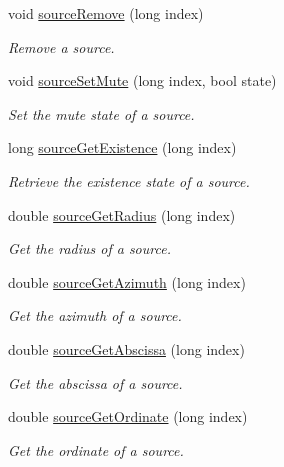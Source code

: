 \begin{DoxyCompactItemize}
void \hyperlink{class_hoa2_d_1_1_sources_manager_ac3af058afdb4367a2c62a89cf9e77c52}{source\-Remove} (long index)
\begin{DoxyCompactList}\small\item\em Remove a source. \end{DoxyCompactList}\item 
void \hyperlink{class_hoa2_d_1_1_sources_manager_ad278d345eded951493e85c9554b61911}{source\-Set\-Mute} (long index, bool state)
\begin{DoxyCompactList}\small\item\em Set the mute state of a source. \end{DoxyCompactList}\item 
long \hyperlink{class_hoa2_d_1_1_sources_manager_a9d183dbdf4f1c3a4d82b6967b12100a8}{source\-Get\-Existence} (long index)
\begin{DoxyCompactList}\small\item\em Retrieve the existence state of a source. \end{DoxyCompactList}\item 
double \hyperlink{class_hoa2_d_1_1_sources_manager_a47692f90509b660bfde8934fb6180d07}{source\-Get\-Radius} (long index)
\begin{DoxyCompactList}\small\item\em Get the radius of a source. \end{DoxyCompactList}\item 
double \hyperlink{class_hoa2_d_1_1_sources_manager_a50e35a2132c05c7cb2b00762e8f1a637}{source\-Get\-Azimuth} (long index)
\begin{DoxyCompactList}\small\item\em Get the azimuth of a source. \end{DoxyCompactList}\item 
double \hyperlink{class_hoa2_d_1_1_sources_manager_ac0471b053e021670d15145134bcc138b}{source\-Get\-Abscissa} (long index)
\begin{DoxyCompactList}\small\item\em Get the abscissa of a source. \end{DoxyCompactList}\item 
double \hyperlink{class_hoa2_d_1_1_sources_manager_a503ab4f7529015ffd58a514f7b24b4db}{source\-Get\-Ordinate} (long index)
\begin{DoxyCompactList}\small\item\em Get the ordinate of a source. \end{DoxyCompactList}\item 

\end{DoxyCompactItemize}
